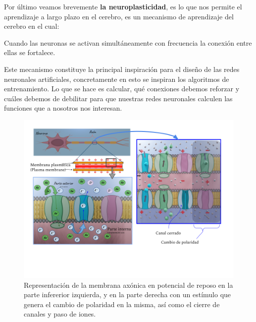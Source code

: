 Por último veamos brevemente \textbf{la neuroplasticidad}, es lo que nos permite el aprendizaje a largo plazo en el cerebro, es un mecanismo de aprendizaje del cerebro en el cual:


Cuando las neuronas se activan simultáneamente con frecuencia la conexión entre ellas se fortalece.


Este mecanismo constituye la principal inspiración para el diseño de las redes neuronales artificiales, concretamente en esto se inspiran los algoritmos de entrenamiento. Lo que se hace es calcular, qué conexiones debemos reforzar y cuáles debemos de debilitar para que nuestras redes neuronales calculen las funciones que a nosotros nos interesan.


\begin{figure}[h]
 \centering
 \includegraphics[scale=0.5]{../Figuras/MembranaP.png}
 \caption{Representación de la membrana axónica en potencial de reposo en la parte infererior izquierda, y en la parte derecha con un estímulo que genera el cambio de polaridad en la misma, así como el cierre de canales y paso de iones.}
 \label{fig:MembranaP}
\end{figure}


